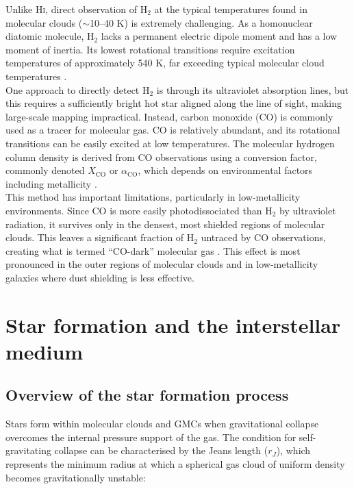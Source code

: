 Unlike \textrm{H\textsc{i}}, direct observation of H$_2$ at the typical temperatures found in molecular clouds ($\sim$10--40 K) is extremely challenging. As a homonuclear diatomic molecule, H$_2$ lacks a permanent electric dipole moment and has a low moment of inertia. Its lowest rotational transitions require excitation temperatures of approximately 540 K, far exceeding typical molecular cloud temperatures \citep{Ferriere_2001, ISF2011}.\\\indent
One approach to directly detect H$_2$ is through its ultraviolet absorption lines, but this requires a sufficiently bright hot star aligned along the line of sight, making large-scale mapping impractical. Instead, carbon monoxide (CO) is commonly used as a tracer for molecular gas. CO is relatively abundant, and its rotational transitions can be easily excited at low temperatures. The molecular hydrogen column density is derived from CO observations using a conversion factor, commonly denoted $X_{\mathrm{CO}}$ or $\alpha_{\mathrm{CO}}$, which depends on environmental factors including metallicity \citep{Bolatto2013}.\\\indent
This method has important limitations, particularly in low-metallicity environments. Since CO is more easily photodissociated than H$_2$ by ultraviolet radiation, it survives only in the densest, most shielded regions of molecular clouds. This leaves a significant fraction of H$_2$ untraced by CO observations, creating what is termed ``CO-dark'' molecular gas \citep{Bolatto2013, Wolfire2010}. This effect is most pronounced in the outer regions of molecular clouds and in low-metallicity galaxies where dust shielding is less effective.


\section{Star formation and the interstellar medium}
\label{sec:SF_and_ism}

\subsection{Overview of the star formation process}

Stars form within molecular clouds and GMCs when gravitational collapse overcomes the internal pressure support of the gas. The condition for self-gravitating collapse can be characterised by the Jeans length ($r_J$), which represents the minimum radius at which a spherical gas cloud of uniform density becomes gravitationally unstable:


